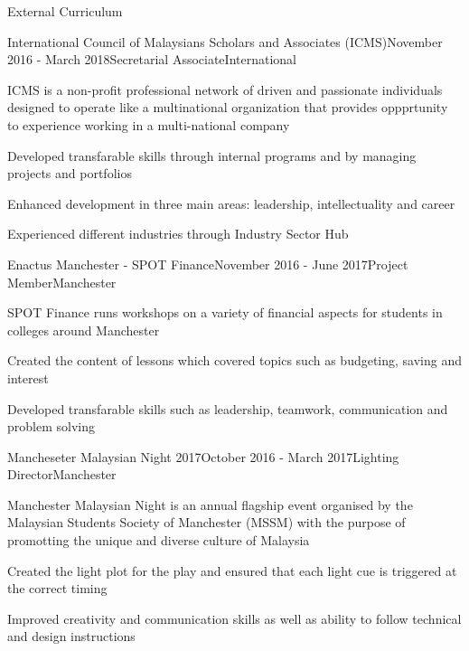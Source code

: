 \documentclass{resume} %
\begin{document}
\begin{rSection}{External Curriculum}

\begin{rSubsection}{International Council of Malaysians Scholars and Associates (ICMS)}{November 2016 - March 2018}{Secretarial Associate}{International}
\item ICMS is a non-profit professional network of driven and passionate individuals designed to operate like a multinational organization that provides oppprtunity to experience working in a multi-national company
\item Developed transfarable skills through internal programs and by managing projects and portfolios
\item Enhanced development in three main areas: leadership, intellectuality and career
\item Experienced different industries through Industry Sector Hub
\end{rSubsection}


\begin{rSubsection}{Enactus Manchester - SPOT Finance}{November 2016 - June 2017}{Project Member}{Manchester}
\item SPOT Finance runs workshops on a variety of financial aspects for students in colleges around Manchester
\item Created the content of lessons which covered topics such as budgeting, saving and interest
\item Developed transfarable skills such as leadership, teamwork, communication and problem solving
\end{rSubsection}


\begin{rSubsection}{Mancheseter Malaysian Night 2017}{October 2016 - March 2017}{Lighting Director}{Manchester}
\item Manchester Malaysian Night is an annual flagship event organised by the Malaysian Students Society of Manchester (MSSM) with the purpose of promotting the unique and diverse culture of Malaysia
\item Created the light plot for the play and ensured that each light cue is triggered at the correct timing
\item Improved creativity and communication skills as well as ability to follow technical and design instructions
\end{rSubsection}


\end{rSection}
\end{document}
